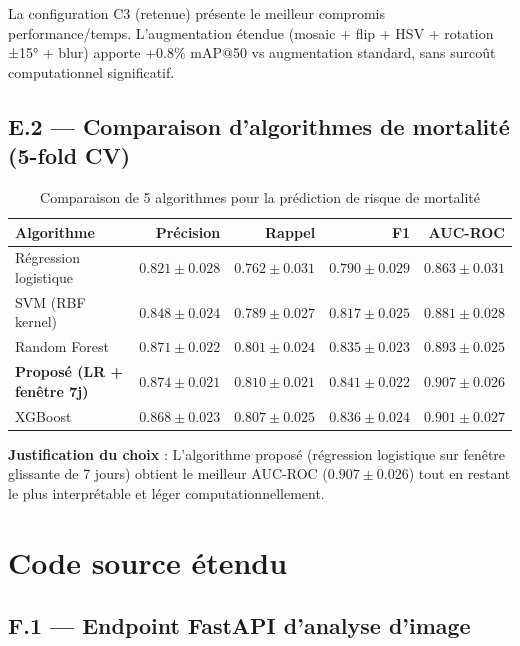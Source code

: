 \documentclass[12pt,a4paper,twoside]{report}
\begin{document}
La configuration C3 (retenue) présente le meilleur compromis performance/temps.
L'augmentation étendue (mosaic + flip + HSV + rotation ±15° + blur) apporte
+0.8\% mAP@50 vs augmentation standard, sans surcoût computationnel significatif.

\section*{E.2 — Comparaison d'algorithmes de mortalité (5-fold CV)}

\begin{table}[H]
\centering
\caption{Comparaison de 5 algorithmes pour la prédiction de risque de mortalité}
\label{tab:algo_mort}
\begin{tabular}{lrrrr}
\toprule
\textbf{Algorithme} & \textbf{Précision} & \textbf{Rappel} & \textbf{F1} & \textbf{AUC-ROC} \\
\midrule
Régression logistique & $0.821 \pm 0.028$ & $0.762 \pm 0.031$ & $0.790 \pm 0.029$ & $0.863 \pm 0.031$ \\
SVM (RBF kernel)      & $0.848 \pm 0.024$ & $0.789 \pm 0.027$ & $0.817 \pm 0.025$ & $0.881 \pm 0.028$ \\
Random Forest         & $0.871 \pm 0.022$ & $0.801 \pm 0.024$ & $0.835 \pm 0.023$ & $0.893 \pm 0.025$ \\
\textbf{Proposé (LR + fenêtre 7j)} & $\mathbf{0.874 \pm 0.021}$ & $\mathbf{0.810 \pm 0.021}$ & $\mathbf{0.841 \pm 0.022}$ & $\mathbf{0.907 \pm 0.026}$ \\
XGBoost               & $0.868 \pm 0.023$ & $0.807 \pm 0.025$ & $0.836 \pm 0.024$ & $0.901 \pm 0.027$ \\
\bottomrule
\end{tabular}
\end{table}

\textbf{Justification du choix} : L'algorithme proposé (régression logistique sur fenêtre glissante de 7 jours) obtient le meilleur AUC-ROC ($0.907 \pm 0.026$) tout en restant le plus interprétable et léger computationnellement.

\chapter{Code source étendu}
\label{ann:code_extended}

\section*{F.1 — Endpoint FastAPI d'analyse d'image}
\end{document}
